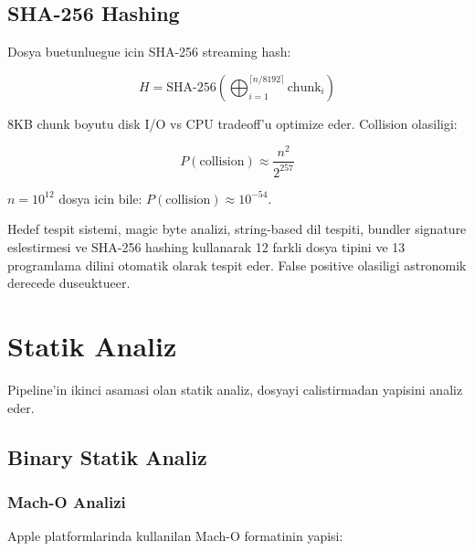 \documentclass[12pt,a4paper,oneside]{book}
\theoremstyle{definition}
\newcommand{\prob}[1]{P\!\left(#1\right)}
\begin{document}
\section{SHA-256 Hashing}
\label{sec:hashing}

Dosya buetunluegue icin SHA-256 streaming hash:

\begin{equation}
H = \text{SHA-256}\!\left(\bigoplus_{i=1}^{\lceil n/8192 \rceil} \text{chunk}_i\right)
\end{equation}

8KB chunk boyutu disk I/O vs CPU tradeoff'u optimize eder. Collision olasiligi:

\begin{equation}
\prob{\text{collision}} \approx \frac{n^2}{2^{257}}
\end{equation}

$n = 10^{12}$ dosya icin bile: $\prob{\text{collision}} \approx 10^{-54}$.

\begin{ozet}
Hedef tespit sistemi, magic byte analizi, string-based dil tespiti, bundler signature eslestirmesi ve SHA-256 hashing kullanarak 12 farkli dosya tipini ve 13 programlama dilini otomatik olarak tespit eder. False positive olasiligi astronomik derecede duseuktueer.
\end{ozet}




\chapter{Statik Analiz}
\label{ch:static}

Pipeline'in ikinci asamasi olan statik analiz, dosyayi calisti\-rmadan yapisini analiz eder.

\section{Binary Statik Analiz}

\subsection{Mach-O Analizi}

Apple platformlarinda kullanilan Mach-O formatinin yapisi:
\end{document}
